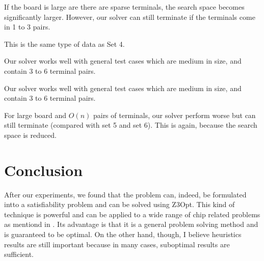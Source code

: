\documentclass{article}
\begin{document}
\begin{spacing}{1.1}
    \begin{table}[H]
        \centering
        \caption{Set 4 (larger board, 1-3 terminals)}
    \end{table}

    If the board is large are there are sparse terminals, the search space becomes significantly larger. However, our solver can still terminate if the terminals come in 1 to 3 pairs.

    \begin{table}[H]
        \centering
        \caption{Set 5 (larger board, 1-3 terminals)}
    \end{table}

    This is the same type of data as Set 4.

    \begin{table}[H]
        \centering
        \caption{Set 6 (general)}
    \end{table}

    Our solver works well with general test cases which are medium in size, and contain 3 to 6 terminal pairs.

    \begin{table}[H]
        \centering
        \caption{Set 7 (general)}
    \end{table}

    Our solver works well with general test cases which are medium in size, and contain 3 to 6 terminal pairs.

    \begin{table}[H]
        \centering
        \caption{Set 8 (devil's test case, large and dense)}
    \end{table}

    For large board and $O(n)$ pairs of terminals, our solver perform worse but can still terminate (compared with set 5 and set 6). This is again, because the search space is reduced.

    \section{Conclusion}
    After our experiments, we found that the problem can, indeed, be formulated intto a satisfiability problem and can be solved using Z3Opt. This kind of technique is powerful and can be applied to a wide range of chip related problems as mentiond in \cite{Keszocze:2015:GER:2840819.2840941}. Its advantage is that it is a general
    problem solving method and is guaranteed to be optimal. On the other hand, though, I believe heuristics results are still important because in many cases, suboptimal results are sufficient.
\end{spacing}
\newpage
\printbibliography
\end{document}
